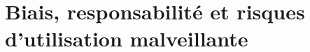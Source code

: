 \chapter{Biais, responsabilité et risques d'utilisation malveillante}
    \section{}
        \subsection{}
            \subsubsection{}